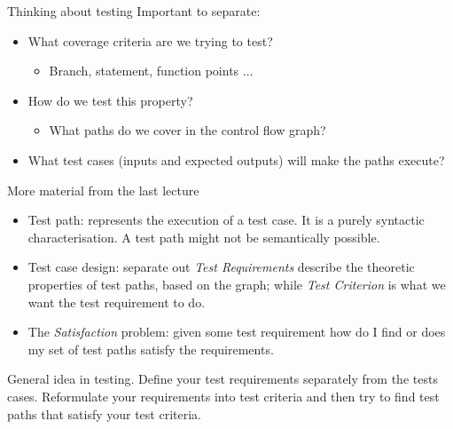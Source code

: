 \documentclass[handout]{beamer}
\begin{document}
%
\begin{frame}{Thinking about testing}
  Important to separate:
  \begin{itemize}
  \item What coverage criteria are we trying to test?
    \begin{itemize}
    \item Branch, statement, function points $\ldots$
    \end{itemize}
  \item How do we test this property?
    \begin{itemize}
    \item What paths do we cover in the control flow graph?
    \end{itemize}
    \item What test cases (inputs and expected outputs) will make the
      paths execute? 
  \end{itemize}
\end{frame}

 \begin{frame}{More material from the last lecture}
   \begin{itemize}
   \item Test path: represents the execution of a test case. It is a
     purely syntactic characterisation.  A test path might not be
     semantically possible.
   \item Test case design: separate out {\em Test Requirements}
     describe the theoretic properties of test paths, based on the
     graph; while {\em Test Criterion} is what we want the test
     requirement to do.
    \item The {\em Satisfaction} problem: given some test requirement how do I
      find or does my set of test paths satisfy the requirements. 
    \end{itemize}
    General idea in testing. Define your test requirements separately from the
    tests cases. Reformulate your requirements into test criteria and then try
    to find test paths that satisfy your test criteria.
\end{frame}
\end{document}
